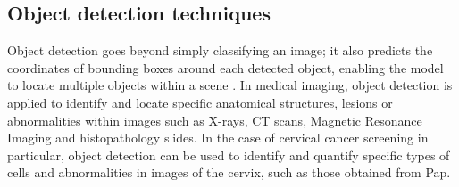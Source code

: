 \documentclass{svjour3}
\begin{document}
\subsection{Object detection techniques}
Object detection goes beyond simply classifying an image; it also predicts the coordinates of bounding boxes around each detected object, enabling the model to locate multiple objects within a scene \cite{ref80}. In medical imaging, object detection is applied to identify and locate specific anatomical structures, lesions or abnormalities within images such as X-rays, CT scans, Magnetic Resonance Imaging and histopathology slides. In the case of cervical cancer screening in particular, object detection can be used to identify and quantify specific types of cells and abnormalities in images of the cervix, such as those obtained from Pap.
\end{document}
